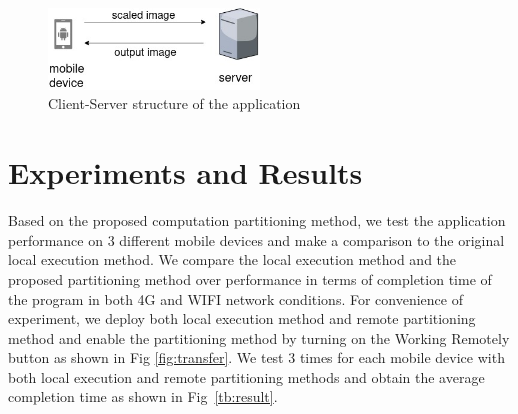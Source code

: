 \documentclass[a4paper,12pt,onecolumn,twoside]{article}
\begin{document}
\begin{CJK*}{GBK}{song}
\begin{figure}[!htb] %
  \centering %
  \includegraphics[width=0.5\textwidth]{partition} %
  \caption{Client-Server structure of the application} %
  \label{fig:C&C} %
\end{figure}

\section{Experiments and Results}

Based on the proposed computation partitioning method,
we test the application performance on 3 different mobile devices
and make a comparison to the original local execution method. 
We compare the local execution method and the proposed 
partitioning method 
over performance in terms of completion time of the program
in both 4G and WIFI network conditions. For convenience of experiment,
we deploy both local execution method and remote partitioning method
and enable the partitioning method by turning on the 
Working Remotely button as shown in Fig \ref{fig:transfer}. 
We test 3 times for each mobile device with both local execution
and remote partitioning methods and obtain the average completion
time as shown in Fig~\ref{tb:result}.



\end{CJK*}
\end{document}
